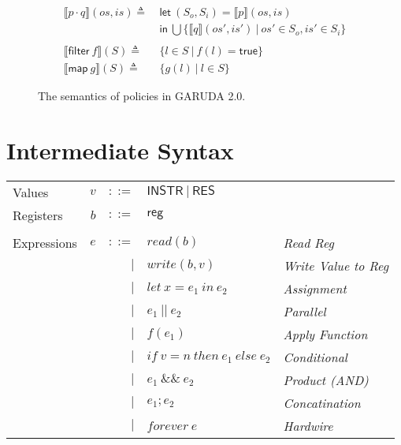 \documentclass[12pt, letterpaper]{article}
\newcommand\interp[1]{\llbracket #1 \rrbracket}
\def \sysname {\textsc{GARUDA 2.0}\xspace}
\begin{document}
\begin{figure}
\begin{align*}
            \interp { p \cdot q }(\mathit{os}, \mathit{is})
              \triangleq\ &
              \mathsf{let}\ (S_o, S_i) = \interp{p}(os, is)\\
              &\mathsf{in}\ \bigcup \{\interp{q}(\mathit{os}',\mathit{is}')\ |\ \mathit{os}'\in S_o, \mathit{is'}\in S_i\}\\
              \\
            \interp{\mathsf{filter}\ f}(S)
              \triangleq\ & \{l \in S\ |\ f(l) = \mathsf{true}\}\\
            \interp{\mathsf{map}\ g}(S)
              \triangleq\ &
              \{ g(l)\ |\ l\in S \} 
          \end{align*}
          \caption{The semantics of policies in \sysname.}
          \label{fig:spec:sem:pol}
        \end{figure}


  \cleardoublepage
  \section{Intermediate Syntax}\label{sec:isyn}

    \begin{tabular}{l r r l l}
      Values        & $v$     & $::=$     & $\mathsf{INSTR\ |\ RES}$ &\\
      Registers     & $b$     & $::=$     & $\mathsf{reg}$           &\\
      \\
      Expressions & $e$ & $::=$  & $read(b)$       
                        & \textit{Read Reg}\\
                  &     & $\mid$ & $write(b,v)$    
                        & \textit{Write Value to Reg}\\
                  &     & $\mid$ & $let\ x = e_1\ in\ e_2$ 
                        & \textit{Assignment}\\  
                  &     & $\mid$ & $e_1\ ||\ e_2$ 
                        & \textit{Parallel}\\
                  &     & $\mid$ & $f(e_1)$        
                        & \textit{Apply Function} \\  
                  &     & $\mid$ & $if\ v = n\ then\ e_1\ else\ e_2$
                        & \textit{Conditional} \\
                  &     & $\mid$ & $e_1\ \&\&\ e_2$ 
                        & \textit{Product (AND)}\\
                  &     & $\mid$ & $e_1 ; e_2$
                        & \textit{Concatination}\\
                  &     & $\mid$ & $forever\ e$ 
                        & \textit{Hardwire}
    \end{tabular}
\end{document}
